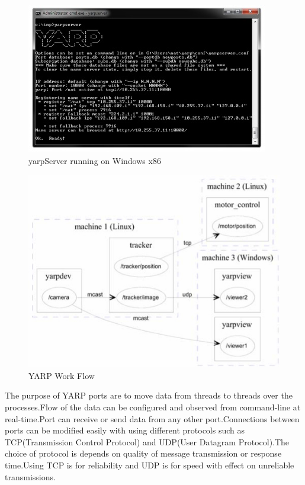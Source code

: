 \documentclass[12pt]{report}
\begin{document}
\begin{figure}[!h]
\begin{center}
\includegraphics[scale=1.0]{yarpServer.jpg}
\caption{yarpServer running on Windows x86}
\end{center}
\end{figure}

\begin{figure}[!h]
\begin{center}
\includegraphics[scale=0.4]{network.jpg}
\caption{YARP Work Flow}
\end{center}
\end{figure}
The purpose of YARP ports are to move data from threads to threads over the processes.Flow of the data can be configured and observed from command-line at real-time.Port can receive or send data from any other port.Connections between ports can be modified easily with using different protocols such as TCP(Transmission Control Protocol) and UDP(User Datagram Protocol).The choice of protocol is depends on quality of message transmission or response time.Using TCP is for reliability and UDP is for speed with effect on unreliable transmissions.
\end{document}
